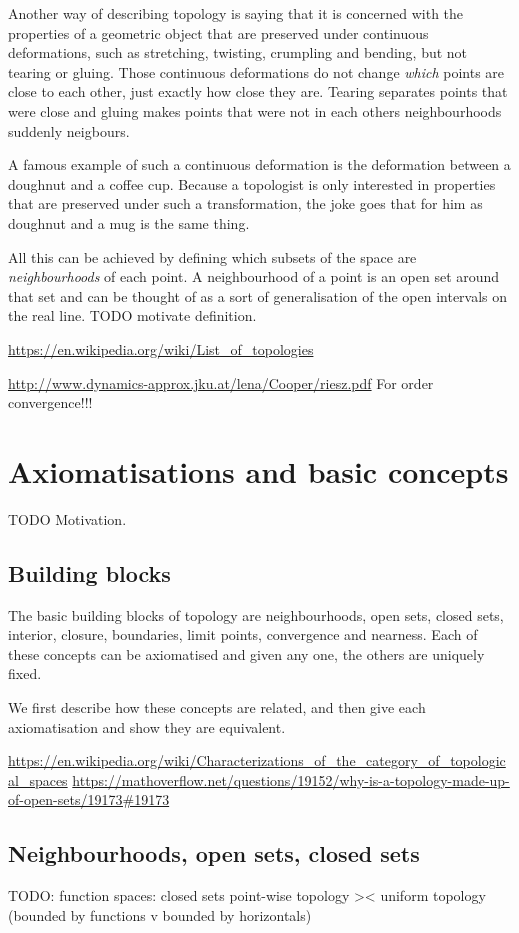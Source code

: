 Another way of describing topology is saying that it is concerned with the properties of a geometric object that are preserved under continuous deformations, such as stretching, twisting, crumpling and bending, but not tearing or gluing. Those continuous deformations do not change \textit{which} points are close to each other, just exactly how close they are. Tearing separates points that were close and gluing makes points that were not in each others neighbourhoods suddenly neigbours.

A famous example of such a continuous deformation is the deformation between a doughnut and a coffee cup. Because a topologist is only interested in properties that are preserved under such a transformation, the joke goes that for him as doughnut and a mug is the same thing.

All this can be achieved by defining which subsets of the space are \textit{neighbourhoods} of each point. A neighbourhood of a point is an open set around that set and can be thought of as a sort of generalisation of the open intervals on the real line. TODO motivate definition.

\url{https://en.wikipedia.org/wiki/List_of_topologies}

\url{http://www.dynamics-approx.jku.at/lena/Cooper/riesz.pdf} For order convergence!!!

\section{Axiomatisations and basic concepts}
TODO Motivation.
\subsection{Building blocks}
The basic building blocks of topology are neighbourhoods, open sets, closed sets, interior, closure, boundaries, limit points, convergence and nearness. Each of these concepts can be axiomatised and given any one, the others are uniquely fixed.

We first describe how these concepts are related, and then give each axiomatisation and show they are equivalent.

\url{https://en.wikipedia.org/wiki/Characterizations_of_the_category_of_topological_spaces} 
\url{https://mathoverflow.net/questions/19152/why-is-a-topology-made-up-of-open-sets/19173#19173}

\subsection{Neighbourhoods, open sets, closed sets}
TODO: function spaces: closed sets point-wise topology >< uniform topology (bounded by functions v bounded by horizontals)

